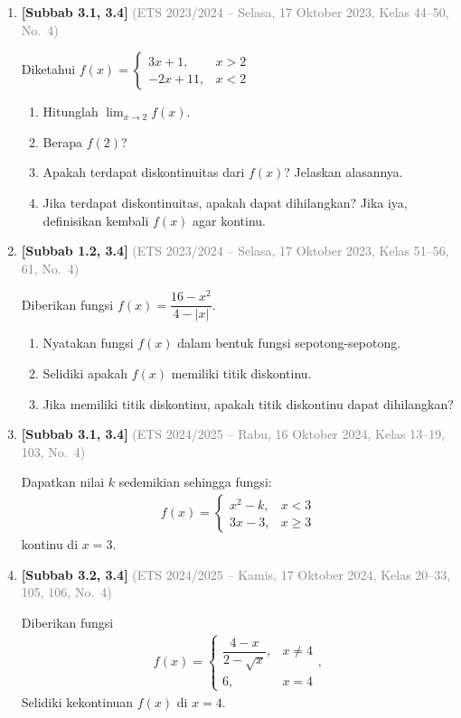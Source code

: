 \documentclass[10pt,openany,a4paper]{article}
\theoremstyle{definition}
\theoremstyle{definition}
\theoremstyle{plain}
\begin{document}
\begin{enumerate}
    \item \textbf{[Subbab 3.1, 3.4]} {\footnotesize\textcolor{gray}{(ETS 2023/2024 -- Selasa, 17 Oktober 2023, Kelas 44--50, No.~4)}}\par
    Diketahui $f(x)=\begin{cases}
        3x+1, & x>2\\
        -2x+11, & x<2
    \end{cases}$
    \begin{enumerate}
        \item Hitunglah $\displaystyle\lim_{x\to 2}f(x)$.
        \item Berapa $f(2)$?
        \item Apakah terdapat diskontinuitas dari $f(x)$? Jelaskan alasannya.
        \item Jika terdapat diskontinuitas, apakah dapat dihilangkan? Jika iya, definisikan kembali $f(x)$ agar kontinu.
    \end{enumerate}

    \item \textbf{[Subbab 1.2, 3.4]} {\footnotesize\textcolor{gray}{(ETS 2023/2024 -- Selasa, 17 Oktober 2023, Kelas 51--56, 61, No.~4)}}\par
    Diberikan fungsi $f(x)=\dfrac{16-x^2}{4-|x|}$.
    \begin{enumerate}
        \item Nyatakan fungsi $f(x)$ dalam bentuk fungsi sepotong-sepotong.
        \item Selidiki apakah $f(x)$ memiliki titik diskontinu.
        \item Jika memiliki titik diskontinu, apakah titik diskontinu dapat dihilangkan?
    \end{enumerate}

    \item \textbf{[Subbab 3.1, 3.4]} {\footnotesize\textcolor{gray}{(ETS 2024/2025 -- Rabu, 16 Oktober 2024, Kelas 13--19, 103, No.~4)}}\par
    Dapatkan nilai $k$ sedemikian sehingga fungsi:
    \begin{align*}
        f(x)=\begin{cases}
            x^2-k, & x<3\\
            3x-3, & x\geq 3
        \end{cases}
    \end{align*}
    kontinu di $x=3$.

    \item \textbf{[Subbab 3.2, 3.4]} {\footnotesize\textcolor{gray}{(ETS 2024/2025 -- Kamis, 17 Oktober 2024, Kelas 20--33, 105, 106, No.~4)}}\par
    Diberikan fungsi
    \begin{align*}
        f(x)=\begin{cases}
            \dfrac{4-x}{2-\sqrt{x}}, & x\neq 4\\
            6, & x=4
        \end{cases},
    \end{align*}
    Selidiki kekontinuan $f(x)$ di $x=4$.


\end{enumerate}
\end{document}
